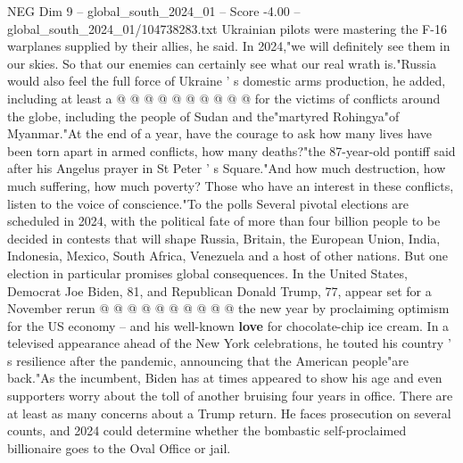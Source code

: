 \begin{textsample}{NEG Dim 9 – global\_south\_2024\_01 – Score -4.00 – global\_south\_2024\_01/104738283.txt}
Ukrainian pilots were mastering the F-16 warplanes supplied by their allies, he said.
In 2024,"we will definitely see them in our skies.
So that our enemies can certainly see what our real wrath is."Russia would also feel the full force of Ukraine ' s domestic arms production, he added, including at least a @ @ @ @ @ @ @ @ @ @ for the victims of conflicts around the globe, including the people of Sudan and the"martyred Rohingya"of Myanmar."At the end of a year, have the courage to ask how many lives have been torn apart in armed conflicts, how many deaths?"the 87-year-old pontiff said after his Angelus prayer in St Peter ' s Square."And how much destruction, how much suffering, how much poverty?
Those who have an interest in these conflicts, listen to the voice of conscience."To the polls Several pivotal elections are scheduled in 2024, with the political fate of more than four billion people to be decided in contests that will shape Russia, Britain, the European Union, India, Indonesia, Mexico, South Africa, Venezuela and a host of other nations.
But one election in particular promises global consequences.
In the United States, Democrat Joe Biden, 81, and Republican Donald Trump, 77, appear set for a November rerun @ @ @ @ @ @ @ @ @ @ the new year by proclaiming optimism for the US economy -- and his well-known \textbf{love} for chocolate-chip ice cream.
In a televised appearance ahead of the New York celebrations, he touted his country ' s resilience after the pandemic, announcing that the American people"are back."As the incumbent, Biden has at times appeared to show his age and even supporters worry about the toll of another bruising four years in office.
There are at least as many concerns about a Trump return.
He faces prosecution on several counts, and 2024 could determine whether the bombastic self-proclaimed billionaire goes to the Oval Office or jail.

\end{textsample}
